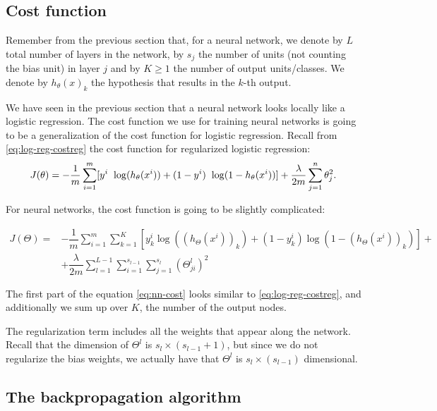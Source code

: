 \documentclass[a4paper,11pt]{report}
\begin{document}
\subsection*{Cost function}

Remember from the previous section that, for a neural network, we denote by $L$ total number of layers in the network, by $s_j$ the number of units (not counting the bias unit) in layer $j$ and by $K \geq 1$ the number of output units/classes. We denote by $h_\theta(x)_k$ the hypothesis that results in the $k$-th output.

We have seen in the previous section that a neural network looks locally like a logistic regression. The cost function we use for training neural networks is going to be a generalization of the cost function for logistic regression. Recall from \eqref{eq:log-reg-costreg} the cost function for regularized logistic regression:
$$ J(\theta) = - \dfrac{1}{m} \sum_{i=1}^m \large[ y^{i}\ \log (h_\theta (x^{i})) + (1 - y^{i})\ \log (1 - h_\theta(x^{i}))\large] + \frac{\lambda}{2m}\sum_{j=1}^n \theta_j^2.$$

For neural networks, the cost function is going to be slightly complicated:

\begin{equation}\label{eq:nn-cost}
\begin{split}
J(\Theta) = & - \dfrac{1}{m} \sum_{i=1}^m \sum_{k=1}^K \left[y^{i}_k \log ((h_\Theta (x^{i}))_k) + (1 - y^{i}_k)\log (1 - (h_\Theta(x^{i}))_k)\right] + \\
            & + \dfrac{\lambda}{2m}\sum_{l=1}^{L-1} \sum_{i=1}^{s_{l-1}} \sum_{j=1}^{s_{l}} \left( \Theta_{ji}^{l}\right)^2
\end{split}
\end{equation}

The first part of the equation \eqref{eq:nn-cost} looks similar to \eqref{eq:log-reg-costreg}, and additionally  we sum up over $K$, the number of the output nodes.

The regularization term includes all the weights that appear along the network. Recall that the dimension of $\Theta^l$ is $s_l \times (s_{l-1}+1)$, but since we do not regularize the bias weights, we actually have that $\Theta^l$ is $s_l \times (s_{l-1})$ dimensional.


\subsection*{The backpropagation algorithm}
\end{document}
